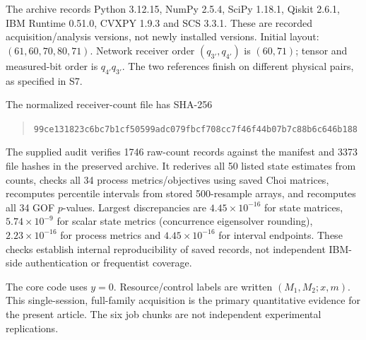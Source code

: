 \documentclass[10pt,a4paper]{article}
\begin{document}
The archive records Python 3.12.15, NumPy 2.5.4, SciPy 1.18.1, Qiskit 2.6.1, IBM Runtime 0.51.0, CVXPY 1.9.3 and SCS 3.3.1. These are recorded acquisition/analysis versions, not newly installed versions. Initial layout: $(61,60,70,80,71)$. Network receiver order $(q_{3'},q_{4'})$ is $(60,71)$; tensor and measured-bit order is $q_{4'}q_{3'}$. The two references finish on different physical pairs, as specified in S7.

The normalized receiver-count file has SHA-256
\begin{quote}\small\nolinkurl{99ce131823c6bc7b1cf50599adc079fbcf708cc7f46f44b07b7c88b6c646b188}\end{quote}
The supplied audit verifies 1746 raw-count records against the manifest and 3373 file hashes in the preserved archive. It rederives all 50 listed state estimates from counts, checks all 34 process metrics/objectives using saved Choi matrices, recomputes percentile intervals from stored 500-resample arrays, and recomputes all 34 GOF $p$-values. Largest discrepancies are $4.45\times10^{-16}$ for state matrices, $5.74\times10^{-9}$ for scalar state metrics (concurrence eigensolver rounding), $2.23\times10^{-16}$ for process metrics and $4.45\times10^{-16}$ for interval endpoints. These checks establish internal reproducibility of saved records, not independent IBM-side authentication or frequentist coverage.

The core code uses $y=0$. Resource/control labels are written $(M_1,M_2;x,m)$. This single-session, full-family acquisition is the primary quantitative evidence for the present article. The six job chunks are not independent experimental replications.
\clearpage
\end{document}
